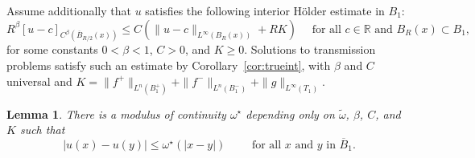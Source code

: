 \documentclass[letter,11pt]{amsart}
\newcommand{\R}{\mathbb{R}}
\newtheorem{lem}[thm]{Lemma}
\theoremstyle{definition}
\numberwithin{equation}{section}
\begin{document}
\medskip

Assume additionally that $u$ satisfies the following interior H\"{o}lder estimate in $B_1$:
\[
R^{\beta} [u - c]_{C^{\beta}(\overline{B}_{R/2}(x))} \leq 
C \left( 
\|u - c\|_{L^{\infty}(B_R(x))} + R K
\right) 
\quad
\text{ for all } c \in \R \text{ and } B_R(x) \subset B_1,
\]
for some constants $0 < \beta < 1$, $C > 0$, and $K \geq 0$.
Solutions to transmission problems satisfy such an estimate by Corollary~\ref{cor:trueint}, with $\beta$ and $C$ universal and $K = \|f^{+}\|_{L^n(B_1^{+})} + \|f^{-}\|_{L^n(B_1^{-})} + \|g\|_{L^{\infty}(T_1)}$.

\medskip

\begin{lem}
There is a modulus of continuity $\omega^{\star}$ depending only on
$\widetilde{\omega}$, $\beta$, $C$, and $K$ such that
\[
|u(x) - u(y)| \leq \omega^{\star}(|x-y|) \qquad \text{ for all } x \text{ and } y \text{ in } \overline{B}_{1}.
\]
\end{lem}
\end{document}
